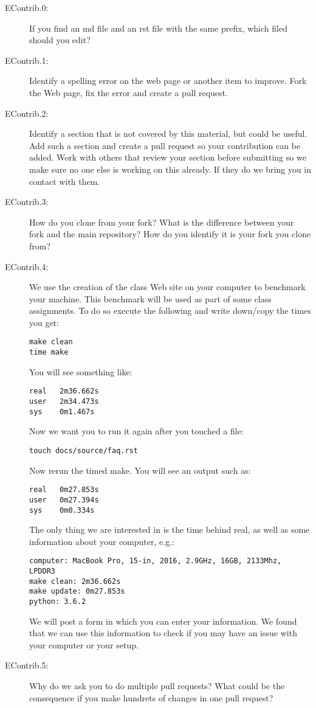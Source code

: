 \begin{description}
\item[EContrib.0:]
If you find an md file and an rst file with the same prefix, which filed
should you edit?
\item[EContrib.1:]
Identify a spelling error on the web page or another item to improve.
Fork the Web page, fix the error and create a pull request.
\item[EContrib.2:]
Identify a section that is not covered by this material, but could be
useful. Add such a section and create a pull request so your
contribution can be added. Work with others that review your section
before submitting so we make sure no one else is working on this
already. If they do we bring you in contact with them.
\item[EContrib.3:]
How do you clone from your fork? What is the difference between your
fork and the main repository? How do you identify it is your fork you
clone from?
\item[EContrib.4:]
We use the creation of the class Web site on your computer to benchmark
your machine. This benchmark will be used as part of some class
assignments. To do so execute the following and write down/copy the
times you get:

\begin{verbatim}
make clean
time make
\end{verbatim}

You will see something like:

\begin{verbatim}
real   2m36.662s
user   2m34.473s
sys    0m1.467s
\end{verbatim}

Now we want you to run it again after you touched a file:

\begin{verbatim}
touch docs/source/faq.rst
\end{verbatim}

Now rerun the timed make. You will see an output such as:

\begin{verbatim}
real   0m27.853s
user   0m27.394s
sys    0m0.334s
\end{verbatim}

The only thing we are interested in is the time behind real, as well as
some information about your computer, e.g.:

\begin{verbatim}
computer: MacBook Pro, 15-in, 2016, 2.9GHz, 16GB, 2133Mhz, LPDDR3
make clean: 2m36.662s
make update: 0m27.853s
python: 3.6.2
\end{verbatim}

We will post a form in which you can enter your information. We found
that we can use this information to check if you may have an issue with
your computer or your setup.
\item[EContrib.5:]
Why do we ask you to do multiple pull requests? What could be the
consequence if you make hundrets of changes in one pull request?
\end{description}
